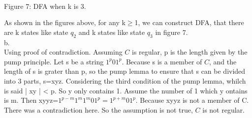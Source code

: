 \documentclass[a4paper, 11pt]{article}
\begin{document}
\begin{center}
\\ Figure 7: DFA when k is 3.

\end{center}
As shown in the figures above, for any k$\geq$1, we can construct DFA, that there are k states like state $q_{2}$ and k states like state $q_{3}$ in figure 7.
\\ b. 
\\ \indent Using proof of contradiction. Assuming $C$ is regular, p is the length given by the pump principle. Let s be a string $1^{p}01^{p}$. Because s is a member of $C$, and the length of s is grater than p, so the pump lemma to ensure that s can be divided into 3 parts, s=xyz. Considering the third condition of the pump lemma, whilch is said | xy | < p. So y only contains 1. Assume the number of 1 which y ontains is m. Then xyyz=$1^{p-m}1^{m}1^{m}01^{p}=1^{p+m}01^{p}$. Because xyyz is not a member of C. There was a contradiction here. So the assumption is not true, $C$ is not regular.
\end{document}
